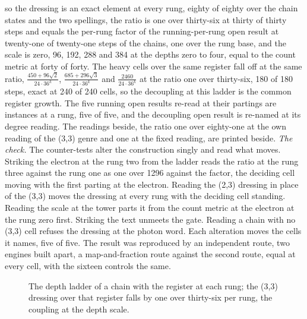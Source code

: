 \begin{chproof}
so the dressing is an exact element at every rung, eighty of eighty over the chain states and the two spellings, the ratio is one over thirty-six at thirty of thirty steps and equals the per-rung factor of the running-per-rung open result at twenty-one of twenty-one steps of the chains, one over the rung base, and the scale is zero, 96, 192, 288 and 384 at the depths zero to four, equal to the count metric at forty of forty. The heavy cells over the same register fall off at the same ratio, $\tfrac{450 + 96\sqrt{2}}{24\cdot 36^{k}}$, $\tfrac{685 + 296\sqrt{3}}{24\cdot 36^{k}}$ and $\tfrac{2460}{24\cdot 36^{k}}$ at the ratio one over thirty-six, 180 of 180 steps, exact at 240 of 240 cells, so the decoupling at this ladder is the common register growth. The five running open results re-read at their partings are instances at a rung, five of five, and the decoupling open result is re-named at its degree reading. The readings beside, the ratio one over eighty-one at the own reading of the (3,3) genre and one at the fixed reading, are printed beside.
\textit{The check.} The counter-tests alter the construction singly and read what moves. Striking the electron at the rung two from the ladder reads the ratio at the rung three against the rung one as one over 1296 against the factor, the deciding cell moving with the first parting at the electron. Reading the (2,3) dressing in place of the (3,3) moves the dressing at every rung with the deciding cell standing. Reading the scale at the tower parts it from the count metric at the electron at the rung zero first. Striking the text unmeets the gate. Reading a chain with no (3,3) cell refuses the dressing at the photon word. Each alteration moves the cells it names, five of five. The result was reproduced by an independent route, two engines built apart, a map-and-fraction route against the second route, equal at every cell, with the sixteen controls the same.
\begin{figure}[h]\centering{}\caption{The depth ladder of a chain with the register at each rung; the (3,3) dressing over that register falls by one over thirty-six per rung, the coupling at the depth scale.}\end{figure}
\end{chproof}
\par\medskip{}\label{narr:close:7-2}\par
